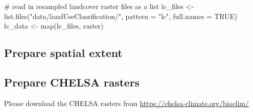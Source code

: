 \documentclass[]{article}
\newenvironment{Shaded}{}{}
\newcommand{\CommentTok}[1]{\textcolor[rgb]{0.00,0.50,0.00}{#1}}
\newcommand{\DataTypeTok}[1]{#1}
\newcommand{\DecValTok}[1]{#1}
\newcommand{\FloatTok}[1]{#1}
\newcommand{\KeywordTok}[1]{\textcolor[rgb]{0.00,0.00,1.00}{#1}}
\newcommand{\NormalTok}[1]{#1}
\newcommand{\OperatorTok}[1]{#1}
\newcommand{\OtherTok}[1]{\textcolor[rgb]{1.00,0.25,0.00}{#1}}
\newcommand{\StringTok}[1]{\textcolor[rgb]{0.00,0.50,0.50}{#1}}
\begin{document}
\begin{Shaded}
\begin{Highlighting}[numbers=left,,]
\CommentTok{# read in resampled landcover raster files as a list}
\NormalTok{lc_files <-}\StringTok{ }\KeywordTok{list.files}\NormalTok{(}\StringTok{"data/landUseClassification/"}\NormalTok{, }\DataTypeTok{pattern =} \StringTok{"lc"}\NormalTok{, }\DataTypeTok{full.names =} \OtherTok{TRUE}\NormalTok{)}
\NormalTok{lc_data <-}\StringTok{ }\KeywordTok{map}\NormalTok{(lc_files, raster)}
\end{Highlighting}
\end{Shaded}

\hypertarget{prepare-spatial-extent}{%
\subsection{Prepare spatial extent}\label{prepare-spatial-extent}}

\begin{Shaded}
\end{Shaded}

\hypertarget{prepare-chelsa-rasters}{%
\subsection{Prepare CHELSA rasters}\label{prepare-chelsa-rasters}}

Please download the CHELSA rasters from \url{https://chelsa-climate.org/bioclim/}
\end{document}
